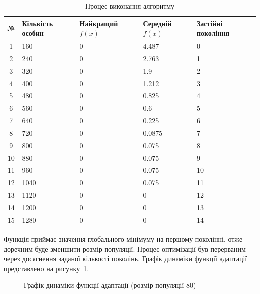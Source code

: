 \begin{table}[H]
  \centering
    \caption{Процес виконання алгоритму}
    \begin{tabular}{| c | l | l | l | l |}
    \hline
    № & Кількість особин & Найкращий $f(x)$ & Середній $f(x)$ & Застійні покоління \\ \hline
    1 & 160 & 0 & 4.487 & 0 \\ \hline
    2 & 240 & 0 & 2.763 & 1 \\ \hline
    3 & 320 & 0 & 1.9 & 2 \\ \hline
    4 & 400 & 0 & 1.212 & 3 \\ \hline
    5 & 480 & 0 & 0.825 & 4 \\ \hline
    6 & 560 & 0 & 0.6 & 5 \\ \hline
    7 & 640 & 0 & 0.225 & 6 \\ \hline
    8 & 720 & 0 & 0.0875 & 7 \\ \hline
    9 & 800 & 0 & 0.075 & 8 \\ \hline
    10 & 880 & 0 & 0.075 & 9 \\ \hline
    11 & 960 & 0 & 0.075 & 10 \\ \hline
    12 & 1040 & 0 & 0.075 & 11 \\ \hline
    13 & 1120 & 0 & 0 & 12 \\ \hline
    14 & 1200 & 0 & 0 & 13 \\ \hline
    15 & 1280 & 0 & 0 & 14 \\
    \hline
    \end{tabular}
    \label{tab:output}
\end{table}

Функція приймає значення глобального мінімуму на першому поколінні, отже доречним буде зменшити розмір популяції. Процес оптимізації був перерваним через досягнення заданої кількості поколінь. Графік динаміки функції адаптації представлено на рисунку~\ref{fig:plot_dynamic}.

\begin{figure}[H]
  \centering
{}
  \captionsetup{justification=centering}
  \caption{Графік динаміки функції адаптації (розмір популяції 80)}
  \label{fig:plot_dynamic}
\end{figure}

